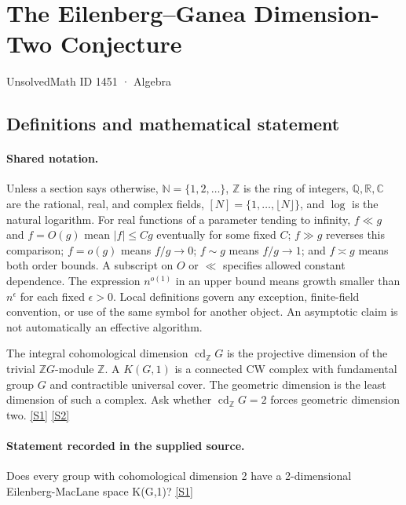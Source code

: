 \documentclass[11pt,a4paper]{article}
\newcommand{\N}{\mathbb{N}}
\newcommand{\Z}{\mathbb{Z}}
\newcommand{\Q}{\mathbb{Q}}
\newcommand{\R}{\mathbb{R}}
\newcommand{\C}{\mathbb{C}}
\newcommand{\sref}[2]{\hyperlink{source:#1:#2}{[S#2]}}
\begin{document}

\setcounter{section}{1450}

\section{The Eilenberg--Ganea Dimension-Two Conjecture}\label{1451}

{\small\sffamily UnsolvedMath ID 1451 · Algebra}

\subsection{Definitions and mathematical statement}

\paragraph{Shared notation.}Unless a section says otherwise, $\N=\{1,2,\ldots\}$,
$\Z$ is the ring of integers, $\Q,\R,\C$ are the rational, real, and complex
fields, $[N]=\{1,\ldots,\lfloor N\rfloor\}$, and $\log$ is the natural
logarithm. For real functions of a parameter tending to infinity,
$f\ll g$ and $f=O(g)$ mean $|f|\leq Cg$ eventually for some fixed $C$;
$f\gg g$ reverses this comparison; $f=o(g)$ means $f/g\to0$;
$f\sim g$ means $f/g\to1$; and $f\asymp g$ means both order bounds.
A subscript on $O$ or $\ll$ specifies allowed constant dependence.
The expression $n^{o(1)}$ in an upper bound means growth smaller than
$n^\epsilon$ for each fixed $\epsilon>0$. Local definitions govern any
exception, finite-field convention, or use of the same symbol for another
object. An asymptotic claim is not automatically an effective algorithm.



The integral cohomological dimension $\operatorname{cd}_{\Z}G$ is the projective dimension of the trivial $\Z G$-module $\Z$. A $K(G,1)$ is a connected CW complex with fundamental group $G$ and contractible universal cover. The geometric dimension is the least dimension of such a complex. Ask whether $\operatorname{cd}_{\Z}G=2$ forces geometric dimension two. \sref{1451}{1} \sref{1451}{2}

\paragraph{Statement recorded in the supplied source.}
Does every group with cohomological dimension 2 have a 2-dimensional Eilenberg-MacLane space K(G,1)? \sref{1451}{1}
\end{document}
